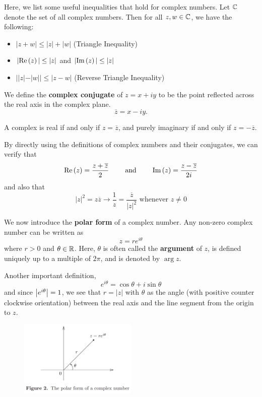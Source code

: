 \documentclass{exam}
\begin{document}
Here, we list some useful inequalities that hold for complex numbers. Let $\mathbb{C}$ denote the set of
all complex numbers. Then for all $z, w \in \mathbb{C}$, we have the following:
\begin{itemize}
    \item $|z + w| \leq |z| + |w|$ (Triangle Inequality)
    \item $|\text{Re}\left( z \right)| \leq |z|$ and $|\text{Im}\left( z \right)| \leq |z|$
    \item $||z| - |w|| \leq |z - w|$ (Reverse Triangle Inequality)
\end{itemize}


We define the \textbf{complex conjugate} of $z = x + iy$ to be the point reflected across the real
axis in the complex plane.
$$\overline{z} = x - iy.$$

A complex is real if and only if $z = \overline{z}$, and purely imaginary if and only if
$z = -\overline{z}$. 

By directly using the definitions of complex numbers and their conjugates, we can verify that
$$\text{Re}\left( z \right) = \frac{z + \overline{z}}{2}\qquad \text{ and } \qquad \text{Im}\left( z \right) = \frac{z - \overline{z}}{2i}$$
and also that
$$|z|^2 = z\overline{z} \longrightarrow \frac{1}{z} = \frac{\overline{z}}{|z|^2} \text{ whenever } z \neq 0$$

\newpage

We now introduce the \textbf{polar form} of a complex number. Any non-zero complex number can be written as
$$z = re^{i\theta}$$
where $r > 0$ and $\theta \in \mathbb {R}$. Here, $\theta$ is often called the \textbf{argument} of $z$, is
defined uniquely up to a multiple of $2\pi$, and is denoted by $\arg{z}$.

Another important definition,
$$e^{i\theta} = \cos{\theta} + i\sin{\theta}$$
and since $\left| e^{i\theta} \right| = 1$, we see that $r = |z|$ with $\theta$ as the angle (with positive
counter clockwise orientation) between the real axis and the line segment from the origin to $z$.

\begin{figure}[H]
    \centering
    \includegraphics[width=0.5\textwidth]{figures/complex_analysis/figure_2.png}
\end{figure}
\end{document}
